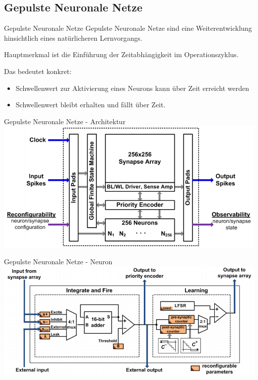 \subsection{Gepulste Neuronale Netze}

\begin{slide}{Gepulste Neuronale Netze}
	Gepulste Neuronale Netze sind eine Weiterentwicklung hinsichtlich eines natürlicheren Lernvorgangs.
	
	Hauptmerkmal ist die \alert{Einführung der Zeitabhängigkeit} im Operationszyklus.

	Das bedeutet konkret:
	\begin{itemize}
		\item Schwellenwert zur Aktivierung eines Neurons kann über Zeit erreicht werden
		\item Schwellenwert bleibt erhalten und fällt über Zeit.
	\end{itemize}
\end{slide}

\begin{slide}{Gepulste Neuronale Netze - Architektur}
	\includegraphics[width=\textwidth,height=0.8\textheight,keepaspectratio]{content/Spiking1.PNG}
\end{slide}

\begin{slide}{Gepulste Neuronale Netze - Neuron}
	\includegraphics[width=\textwidth,height=0.8\textheight,keepaspectratio]{content/Spiking2.PNG}
\end{slide}